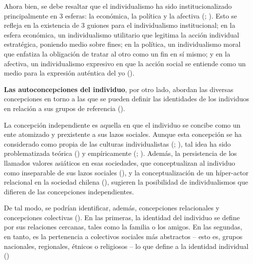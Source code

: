 \documentclass[
  letterpaper,
  DIV=11,
  numbers=noendperiod]{scrartcl}
\begin{document}
Ahora bien, se debe resaltar que el individualismo ha sido
institucionalizado principalmente en 3 esferas: la económica, la
política y la afectiva (; ). Esto se
refleja en la existencia de 3 guiones para el individualismo
institucional; en la esfera económica, un individualismo utilitario que
legitima la acción individual estratégica, poniendo medio sobre fines;
en la política, un individualismo moral que enfatiza la obligación de
tratar al otro como un fin en sí mismo; y en la afectiva, un
individualismo expresivo en que la acción social se entiende como un
medio para la expresión auténtica del yo
().

\textbf{Las autoconcepciones del individuo}, por otro lado, abordan las
diversas concepciones en torno a las que se pueden definir las
identidades de los individuos en relación a sus grupos de referencia
().

La concepción independiente es aquella en que el individuo se concibe
como un ente atomizado y prexistente a sus lazos sociales. Aunque esta
concepción se ha considerado como propia de las culturas individualistas
(;
), tal idea
ha sido problematizada teórica () y empíricamente (; ).
Además, la persistencia de los llamados valores asiáticos en esas
sociedades, que conceptualizan al individuo como inseparable de sus
lazos sociales (), y la
conceptualización de un híper-actor relacional en la sociedad chilena
(), sugieren la
posibilidad de individualismos que difieren de las concepciones
independientes.

De tal modo, se podrían identificar, además, concepciones relacionales y
concepciones colectivas ().
En las primeras, la identidad del individuo se define por sus relaciones
cercanas, tales como la familia o los amigos. En las segundas, en tanto,
es la pertenencia a colectivos sociales más abstractos -- esto es,
grupos nacionales, regionales, étnicos o religiosos -- lo que define a
la identidad individual ()
\end{document}
